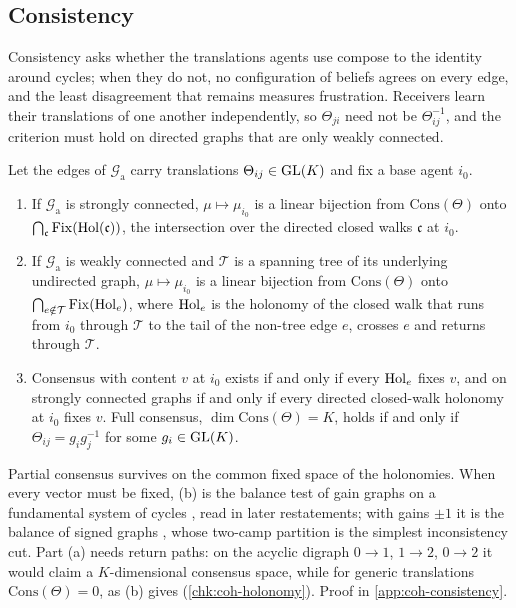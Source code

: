 \subsection{Consistency}\label{sec:coh-consistency}

Consistency asks whether the translations agents use compose to the identity around cycles; when they do not, no configuration of beliefs agrees on every edge, and the least disagreement that remains measures frustration. Receivers learn their translations of one another independently, so $\Theta_{ji}$ need not be $\Theta_{ij}^{-1}$, and the criterion must hold on directed graphs that are only weakly connected.

\begin{theorem}\label{thm:coh-holonomy}
Let the edges of $\mathcal G_{\mathrm a}$ carry translations $\Theta_{ij}\in\mathrm{GL}(K)$ and fix a base agent $i_0$.
\begin{enumerate}\renewcommand{\labelenumi}{(\alph{enumi})}
\item If $\mathcal G_{\mathrm a}$ is strongly connected, $\mu\mapsto\mu_{i_0}$ is a linear bijection from $\mathrm{Cons}(\Theta)$ onto $\bigcap_{\mathfrak c}\mathrm{Fix}(\operatorname{Hol}(\mathfrak c))$, the intersection over the directed closed walks $\mathfrak c$ at $i_0$.
\item If $\mathcal G_{\mathrm a}$ is weakly connected and $\mathcal T$ is a spanning tree of its underlying undirected graph, $\mu\mapsto\mu_{i_0}$ is a linear bijection from $\mathrm{Cons}(\Theta)$ onto $\bigcap_{e\notin\mathcal T}\mathrm{Fix}(\operatorname{Hol}_e)$, where $\operatorname{Hol}_e$ is the holonomy of the closed walk that runs from $i_0$ through $\mathcal T$ to the tail of the non-tree edge $e$, crosses $e$ and returns through $\mathcal T$.
\item Consensus with content $v$ at $i_0$ exists if and only if every $\operatorname{Hol}_e$ fixes $v$, and on strongly connected graphs if and only if every directed closed-walk holonomy at $i_0$ fixes $v$. Full consensus, $\dim\mathrm{Cons}(\Theta)=K$, holds if and only if $\Theta_{ij}=g_ig_j^{-1}$ for some $g_i\in\mathrm{GL}(K)$.
\end{enumerate}
\end{theorem}

Partial consensus survives on the common fixed space of the holonomies. When every vector must be fixed, (b) is the balance test of gain graphs on a fundamental system of cycles \citep{zaslavsky1989biased}, read in later restatements; with gains $\pm1$ it is the balance of signed graphs \citep{harary1953notion}, whose two-camp partition \citep{cartwright1956structural} is the simplest inconsistency cut. Part (a) needs return paths: on the acyclic digraph $0\to1$, $1\to2$, $0\to2$ it would claim a $K$-dimensional consensus space, while for generic translations $\mathrm{Cons}(\Theta)=0$, as (b) gives (\cref{chk:coh-holonomy}). Proof in \cref{app:coh-consistency}.

